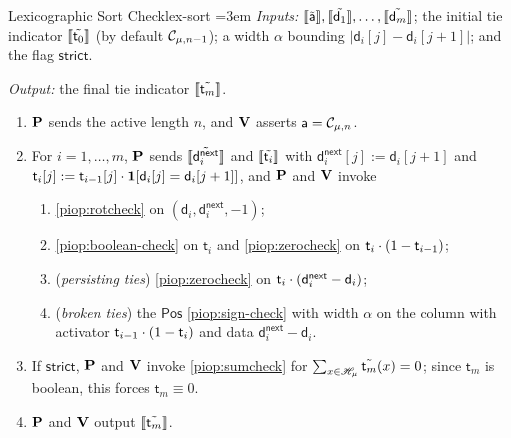 \begin{DefinePIOP}{Lexicographic Sort Check}{lex-sort}
  \emergencystretch=3em\relax
  \emph{Inputs:} $\llbracket\tilde{\mathsf{a}}\rrbracket, \llbracket\tilde{\mathsf{d}_1}\rrbracket, \dots, \llbracket\tilde{\mathsf{d}_m}\rrbracket$; the initial tie indicator $\llbracket\tilde{\mathsf{t}_0}\rrbracket$ (by default $\mathcal{C}_{\mu,n-1}$); a width $\alpha$ bounding $|\mathsf{d}_i[j] - \mathsf{d}_i[j+1]|$; and the flag $\mathsf{strict}$.
  \vspace{1mm}

  \noindent\emph{Output:} the final tie indicator $\llbracket\tilde{\mathsf{t}_m}\rrbracket$.
  \vspace{2mm}
  \begin{enumerate}[nosep]
    \item $\bf{P}$ sends the active length $n$, and $\bf{V}$ asserts $\mathsf{a} = \mathcal{C}_{\mu,n}$.
    \item For $i = 1, \dots, m$, $\bf{P}$ sends $\llbracket\tilde{\mathsf{d}_i^{\mathsf{next}}}\rrbracket$ and $\llbracket\tilde{\mathsf{t}_i}\rrbracket$ with $\mathsf{d}_i^{\mathsf{next}}[j] := \mathsf{d}_i[j+1]$ and $\mathsf{t}_i[j] := \mathsf{t}_{i-1}[j] \cdot \mathbf{1}[\mathsf{d}_i[j] = \mathsf{d}_i[j+1]]$, and $\bf{P}$ and $\bf{V}$ invoke
    \begin{enumerate}[nosep]
      \item \cref{piop:rotcheck} on $(\mathsf{d}_i, \mathsf{d}_i^{\mathsf{next}}, -1)$;
      \item \cref{piop:boolean-check} on $\mathsf{t}_i$ and \cref{piop:zerocheck} on $\mathsf{t}_i \cdot (1 - \mathsf{t}_{i-1})$;
      \item (\emph{persisting ties}) \cref{piop:zerocheck} on $\mathsf{t}_i \cdot (\mathsf{d}_i^{\mathsf{next}} - \mathsf{d}_i)$;
      \item (\emph{broken ties}) the $\mathsf{Pos}$ \cref{piop:sign-check} with width $\alpha$ on the column with activator $\mathsf{t}_{i-1} \cdot (1 - \mathsf{t}_i)$ and data $\mathsf{d}_i^{\mathsf{next}} - \mathsf{d}_i$.
    \end{enumerate}
    \item If $\mathsf{strict}$, $\bf{P}$ and $\bf{V}$ invoke \cref{piop:sumcheck} for $\sum_{x \in \mathscr{H}_{\mu}} \tilde{\mathsf{t}_m}(x) = 0$; since $\mathsf{t}_m$ is boolean, this forces $\mathsf{t}_m \equiv 0$.
    \item $\bf{P}$ and $\bf{V}$ output $\llbracket\tilde{\mathsf{t}_m}\rrbracket$.
  \end{enumerate}
\end{DefinePIOP}

